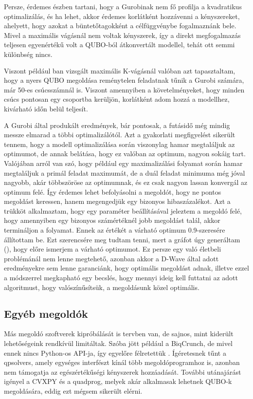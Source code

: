 Persze, érdemes észben tartani, hogy a Gurobinak nem fő profilja a kvadratikus optimalizálás, és ha lehet, akkor érdemes korlátként hozzávenni a kényszereket, ahelyett, hogy azokat a büntetőtagokként a célfüggvénybe fogalmaznánk bele. Mivel a maximális vágásnál nem voltak kényszerek, így a direkt megfogalmazás teljesen egyenértékű volt a QUBO-ból átkonvertált modellel, tehát ott semmi különbség nincs.

Viszont például ban vizsgált maximális K-vágásnál valóban azt tapasztaltam, hogy a nyers QUBO megoldása reménytelen feladatnak tűnik a Gurobi számára, már 50-es csúcsszámnál is. Viszont amennyiben a követelményeket, hogy minden csúcs pontosan egy csoportba kerüljön, korlátként adom hozzá a modellhez, kivárható időn belül teljesít.

A Gurobi által produkált eredmények, bár pontosak, a futásidő még mindig messze elmarad a többi optimalizálótól. Azt a gyakorlati megfigyelést sikerült tennem, hogy a modell optimalizálása során viszonylag hamar megtaláljuk az optimumot, de annak belátása, hogy ez valóban az optimum, nagyon sokáig tart. 
Valójában arról van szó, hogy például egy maximalizálási folyamat során hamar megtaláljuk a primál feladat maximumát, de a duál feladat minimuma még jóval nagyobb, akár többszöröse az optimumnak, és ez csak nagyon lassan konvergál az optimum felé. Így érdemes lehet befolyásolni a megoldót, hogy ne pontos megoldást keressen, hanem megengedjük egy bizonyos hibaszázalékot. Azt a trükköt alkalmaztam, hogy egy paraméter beállításával jeleztem a megoldó felé, hogy amennyiben egy bizonyos számértéknél jobb megoldást talál, akkor termináljon a folyamat\cite{gurobiBestObjStop}. Ennek az értékét a várható optimum 0.9-szeresére állítottam be. Ezt szerencsére meg tudtam tenni, mert a gráfot úgy generáltam (), hogy előre ismerjem a várható optimumot. Ez persze egy való életbeli problémánál nem lenne megtehető, azonban akkor a D-Wave által adott eredményekre sem lenne garanciánk, hogy optimális megoldást adnak, illetve ezzel a módszerrel megkapható egy becslés, hogy mennyi ideig kell futtatni az adott algoritmust, hogy valószínűsítsük, a megoldásunk közel optimális.

\subsection{Egyéb megoldók}\label{sec:practiceOthers}

Más megoldó szoftverek kipróbálását is tervben van, de sajnos, mint kiderült lehetőségeink rendkívül limitáltak. Szóba jött például a BiqCrunch, de mivel ennek nincs Python-os API-ja, így egyelőre félretettük \cite{biqcrunch}. Ígéretesnek tűnt a qpsolvers\cite{qpsolvers}, amely egységes interfészt kínál több megoldóprogramhoz is, azonban nem támogatja az egészértékűségi kényszerek hozzáadását. További utánajárást igényel a CVXPY\cite{cvxpy} és a quadprog\cite{quadprog}, melyek akár alkalmasak lehetnek QUBO-k megoldására, eddig ezt mégsem sikerült elérni.

